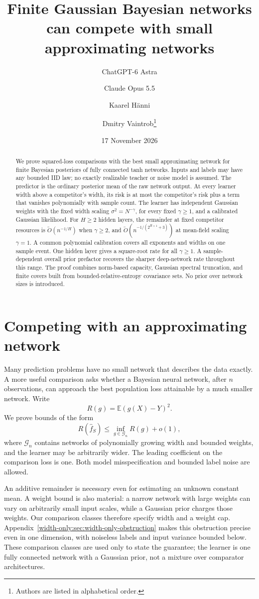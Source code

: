 \documentclass[11pt]{article}
\title{Finite Gaussian Bayesian networks can compete with small approximating networks}
\author{ChatGPT-6 Astra \and Claude Opus 5.5 \and Kaarel H\"anni \and
Dmitry Vaintrob\thanks{Authors are listed in alphabetical order.}}
\date{17 November 2026}
\theoremstyle{remark}\newtheorem{remark}[theorem]{Remark}
\begin{document}
\maketitle
\begin{abstract}
We prove squared-loss comparisons with the best small approximating network for finite Bayesian posteriors of fully connected tanh networks. Inputs and labels may have any bounded IID law; no exactly realizable teacher or noise model is assumed. The predictor is the ordinary posterior mean of the raw network output. At every learner width above a competitor's width, its risk is at most the competitor's risk plus a term that vanishes polynomially with sample count. The learner has independent Gaussian weights with the fixed width scaling $\sigma^2=N^{-\gamma}$, for every fixed $\gamma\ge1$, and a calibrated Gaussian likelihood. For $H\ge2$ hidden layers, the remainder at fixed competitor resources is $\widetilde O(n^{-1/H})$ when $\gamma\ge2$, and $\widetilde O(n^{-1/(2^{H+1}+3)})$ at mean-field scaling $\gamma=1$. A common polynomial calibration covers all exponents and widths on one sample event. One hidden layer gives a square-root rate for all $\gamma\ge1$. A sample-dependent overall prior prefactor recovers the sharper deep-network rate throughout this range. The proof combines norm-based capacity, Gaussian spectral truncation, and finite covers built from bounded-relative-entropy covariance sets. No prior over network sizes is introduced.
\end{abstract}

\section{Competing with an approximating network}
Many prediction problems have no small network that describes the data exactly. A more useful comparison asks whether a Bayesian neural network, after $n$ observations, can approach the best population loss attainable by a much smaller network. Write
\[
 R(g)=\mathbb E(g(X)-Y)^2.
\]
We prove bounds of the form
\[
 R(\widehat f_S)\leq\inf_{g\in\mathcal G_n}R(g)+o(1),
\]
where $\mathcal G_n$ contains networks of polynomially growing width and bounded weights, and the learner may be arbitrarily wider. The leading coefficient on the comparison loss is one. Both model misspecification and bounded label noise are allowed.

An additive remainder is necessary even for estimating an unknown constant mean. A weight bound is also material: a narrow network with large weights can vary on arbitrarily small input scales, while a Gaussian prior charges those weights. Our comparison classes therefore specify width and a weight cap. Appendix~\ref{width-only:sec:width-only-obstruction} makes this obstruction precise even in one dimension, with noiseless labels and input variance bounded below. These comparison classes are used only to state the guarantee; the learner is one fully connected network with a Gaussian prior, not a mixture over comparator architectures.
\end{document}
